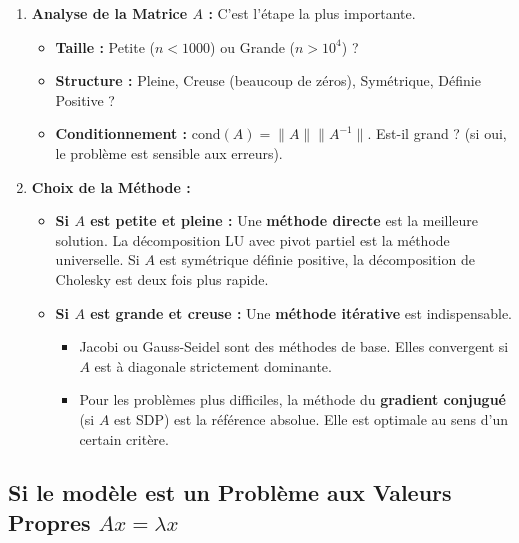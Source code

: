 \begin{proposition}[Checklist pour $Ax=b$]
    \begin{enumerate}
        \item \textbf{Analyse de la Matrice $A$ :} C'est l'étape la plus importante.
            \begin{itemize}
                \item \textbf{Taille :} Petite ($n < 1000$) ou Grande ($n > 10^4$) ?
                \item \textbf{Structure :} Pleine, Creuse (beaucoup de zéros), Symétrique, Définie Positive ?
                \item \textbf{Conditionnement :} $\mathrm{cond}(A) = \|A\| \|A^{-1}\|$. Est-il grand ? (si oui, le problème est sensible aux erreurs).
            \end{itemize}
        \item \textbf{Choix de la Méthode :}
            \begin{itemize}
                \item \textbf{Si $A$ est petite et pleine :} Une \textbf{méthode directe} est la meilleure solution. La décomposition LU avec pivot partiel est la méthode universelle. Si $A$ est symétrique définie positive, la décomposition de Cholesky est deux fois plus rapide.
                \item \textbf{Si $A$ est grande et creuse :} Une \textbf{méthode itérative} est indispensable.
                    \begin{itemize}
                        \item Jacobi ou Gauss-Seidel sont des méthodes de base. Elles convergent si $A$ est à diagonale strictement dominante.
                        \item Pour les problèmes plus difficiles, la méthode du \textbf{gradient conjugué} (si $A$ est SDP) est la référence absolue. Elle est optimale au sens d'un certain critère.
                    \end{itemize}
            \end{itemize}
    \end{enumerate}
\end{proposition}

\subsection{Si le modèle est un Problème aux Valeurs Propres $Ax=\lambda x$}

